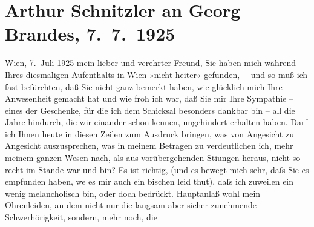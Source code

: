                \section[Arthur Schnitzler an Georg Brandes, 7. 7. 1925]{ Arthur Schnitzler an Georg Brandes, 7. 7. 1925}\nopagebreak{}\rehead{ }\begin{ledgroupsized}[t]{13cm}\normalsize\beginnumbering \toendnotes[C]{\smallbreak\pagebreak[2]} 
\toendnotes[C]{\smallbreak}\pstart
           \raggedleft{}{\pb}Wien, 7. Juli 1925\pend
           \pstart
           mein lieber und verehrter Freund, Sie haben mich während Ihres
               diesmaligen Aufenthalts in Wien »nicht heiter«
               gefunden, – und so muß ich fast befürchten, daß Sie nicht ganz bemerkt haben, wie
               glücklich mich Ihre Anwesenheit gemacht hat und wie froh ich war, daß Sie mir Ihre
               Sympathie – eines der Geschenke, für die ich dem Schicksal besonders dankbar bin –
               all die Jahre hindurch, die wir einander schon kennen, ungehindert erhalten haben.
               Darf ich Ihnen heute in diesen Zeilen zum Ausdruck bringen, was von Angesicht zu
               Angesicht auszusprechen, was in meinem Betragen zu verdeutlichen ich, mehr meinem
               ganzen Wesen nach, als aus vorübergehenden Sti{\geminationm}ungen
               heraus, nicht so recht im Stande war und bin? Es ist richtig, (und es bewegt mich
               sehr, daſs Sie es empfunden haben, we{\geminationn} es mir auch ein
               bischen leid thut), daſs ich {\pb}zuweilen ein wenig
               melancholisch bin, oder doch bedrückt. Hauptanlaß wohl mein Ohrenleiden, an dem nicht
               nur die langsam aber sicher zunehmende Schwerhörigkeit, sondern, mehr noch, die

\end{ledgroupsized}
